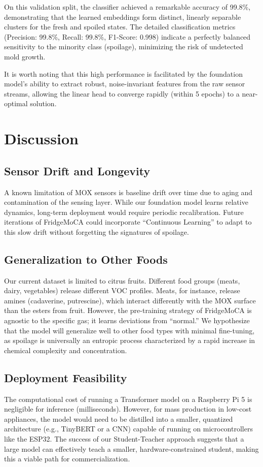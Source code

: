 \documentclass[conference]{IEEEtran}
\begin{document}
    On this validation split, the classifier achieved a remarkable accuracy of 99.8\%, demonstrating that the learned embeddings form distinct, linearly separable clusters for the fresh and spoiled states. The detailed classification metrics (Precision: 99.8\%, Recall: 99.8\%, F1-Score: 0.998) indicate a perfectly balanced sensitivity to the minority class (spoilage), minimizing the risk of undetected mold growth.

    It is worth noting that this high performance is facilitated by the foundation model's ability to extract robust, noise-invariant features from the raw sensor streams, allowing the linear head to converge rapidly (within 5 epochs) to a near-optimal solution.

    \section{Discussion}

    \subsection{Sensor Drift and Longevity}
    A known limitation of MOX sensors is baseline drift over time due to aging and contamination of the sensing layer. While our foundation model learns relative dynamics, long-term deployment would require periodic recalibration. Future iterations of FridgeMoCA could incorporate ``Continuous Learning'' to adapt to this slow drift without forgetting the signatures of spoilage.

    \subsection{Generalization to Other Foods}
    Our current dataset is limited to citrus fruits. Different food groups (meats, dairy, vegetables) release different VOC profiles. Meats, for instance, release amines (cadaverine, putrescine), which interact differently with the MOX surface than the esters from fruit. However, the pre-training strategy of FridgeMoCA is agnostic to the specific gas; it learns deviations from ``normal.'' We hypothesize that the model will generalize well to other food types with minimal fine-tuning, as spoilage is universally an entropic process characterized by a rapid increase in chemical complexity and concentration.

    \subsection{Deployment Feasibility}
    The computational cost of running a Transformer model on a Raspberry Pi 5 is negligible for inference (milliseconds). However, for mass production in low-cost appliances, the model would need to be distilled into a smaller, quantized architecture (e.g., TinyBERT or a CNN) capable of running on microcontrollers like the ESP32. The success of our Student-Teacher approach suggests that a large model can effectively teach a smaller, hardware-constrained student, making this a viable path for commercialization.
\end{document}

